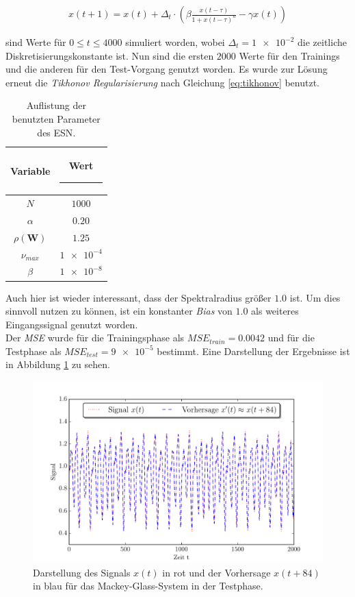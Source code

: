\begin{align}
x(t+1) = x(t) + \Delta_t \cdot \left(\beta \frac{x(t-\tau)}{1+x(t-\tau)^n}-\gamma x(t)  \right)
\end{align}

sind Werte für $0 \leq t \leq 4000$ simuliert worden, wobei $\Delta_t=\num{1e-2}$ die zeitliche Diskretisierungskonstante ist. Nun sind die ersten $2000$ Werte für den Trainings und die anderen für den Test-Vorgang genutzt worden. Es wurde zur Lösung erneut die \textit{Tikhonov Regularisierung} nach Gleichung \ref{eq:tikhonov} benutzt.

\begin{table}[H]
	\centering
		\begin{tabular}{|c|c|}
		\rule[-1ex]{0pt}{3.5ex} Variable & \hspace{4ex} Wert \rule[-1ex]{4ex}{0pt}\\ 
		\hline \hline 
		\rule[-1ex]{0pt}{3.5ex} $N$ & $1000$ \\ 
		\hline 
		\rule[-1ex]{0pt}{3.5ex} $\alpha$ & $0.20$ \\ 
		\hline 
		\rule[-1ex]{0pt}{3.5ex} $\rho(\mathbf{W})$ & $1.25$ \\ 
		\hline 
		\rule[-1ex]{0pt}{3.5ex} $\nu_{max}$ & $\num{1e-4}$ \\ 
		\hline 
		\rule[-1ex]{0pt}{3.5ex} $\beta$ & $\num{1e-8}$ \\ 
		\hline 
	\end{tabular} 
	\caption{Auflistung der benutzten Parameter des \textsc{ESN}.}
\label{tab:application_mackeyglass}
\end{table}

Auch hier ist wieder interessant, dass der Spektralradius größer $1.0$ ist. Um dies sinnvoll nutzen zu können, ist ein konstanter \textit{Bias} von $1.0$ als weiteres Eingangssignal genutzt worden.\\
Der \textit{MSE} wurde für die Trainingsphase als $MSE_{train} = 0.0042$ und für die Testphase als $MSE_{test} = \num{9e-5}$ bestimmt.
Eine Darstellung der Ergebnisse ist in Abbildung \ref{fig:application_mackeyglass} zu sehen.

\begin{figure}[H]
    \centering
    \includegraphics[width = 0.9 \textwidth]{figures/mackeyglass_pred.pdf}
    \caption{Darstellung des Signals $x(t)$ in rot und der Vorhersage $x(t+84)$ in blau für das Mackey-Glass-System in der Testphase.}
    \label{fig:application_mackeyglass}
\end{figure}

